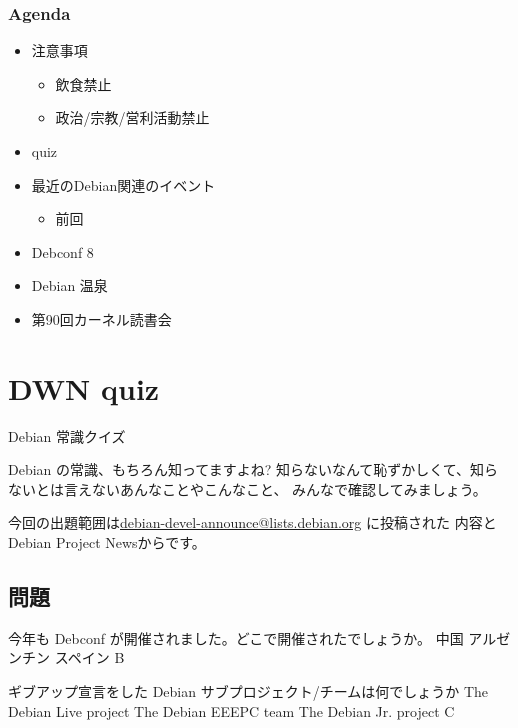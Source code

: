 \documentclass[cjk,dvipdfmx,12pt]{beamer}
\begin{document}
\begin{frame}
 \frametitle{Agenda}
\begin{minipage}[t]{0.45\hsize}
  \begin{itemize}
  \item 注意事項
	\begin{itemize}
	 \item 飲食禁止
	 \item 政治/宗教/営利活動禁止
	\end{itemize}
  \item quiz
  \item 最近のDebian関連のイベント
	\begin{itemize}
	 \item 前回 
	\end{itemize}
 \end{itemize}
\end{minipage} 
\begin{minipage}[t]{0.45\hsize}
 \begin{itemize}
  \item Debconf 8
  \item Debian 温泉
  \item 第90回カーネル読書会
 \end{itemize}
\end{minipage}
\end{frame}



\section{DWN quiz}
\begin{frame}{Debian 常識クイズ}

Debian の常識、もちろん知ってますよね?
知らないなんて恥ずかしくて、知らないとは言えないあんなことやこんなこと、
みんなで確認してみましょう。

今回の出題範囲は\url{debian-devel-announce@lists.debian.org} に投稿された
内容とDebian Project Newsからです。

\end{frame}

\subsection{問題}

 \santaku
 {今年も Debconf が開催されました。どこで開催されたでしょうか。}
 {中国}
 {アルゼンチン}
 {スペイン}
 {B}
 
 \santaku
 {ギブアップ宣言をした Debian サブプロジェクト/チームは何でしょうか}
 {The Debian Live project}
 {The Debian EEEPC team}
 {The Debian Jr. project}
 {C}
\end{document}
